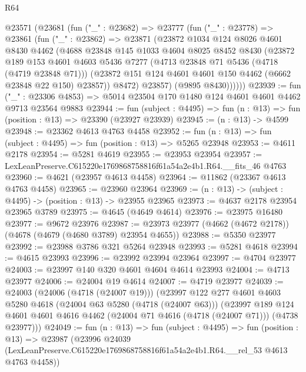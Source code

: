 \begin{lexlean}{R64}
\begin{coremodule}
    @23571
      (@23681
        (fun ("_" : @23682) =>
        @23777
          (fun ("_" : @23778) =>
          @23861
            (fun ("_" : @23862) =>
            @23871
              (@23872
                @1034
                @124
                @8026
                @4601
                @8430
                @4462
                (@4688
                  @23848
                  @145
                  @1033
                  @4604
                  @8025
                  @8452
                  @8430
                  (@23872
                    @189
                    @153
                    @4601
                    @4603
                    @5436
                    @7277
                    (@4713 @23848 @71 @5436 (@4718 (@4719 @23848 @71)))
                    (@23872 @151 @124 @4601 @4601 @150 @4462 (@6662 @23848 @22 @150) @23857))
                  @8472)
                @23857)
              (@9895 @8430))))))
@23939 := fun ("_" : @23306 @4853) =>
  @5014 @23504 @170 @1480 @124 @4601 @4601 @4462 @9713 @23564 @9883
@23944 := fun (subject : @4495) => fun (n : @13) => fun (position : @13) => @23390 (@23927 @23939)
@23945 := (n : @13) -> @4599
@23948 := @23362 @4613 @4763 @4458
@23952 := fun (n : @13) => fun (subject : @4495) => fun (position : @13) => @5265 @23948
@23953 := @4611 @2178
@23954 := @5281 @4619
@23955 := @23953 @23954
@23957 := LexLeanPreserve.C615220e1769868758816f61a54a2e4b1.R64.__fits_46 @4763
@23960 := @4621 (@23957 @4613 @4458)
@23964 := @11862 (@23367 @4613 @4763 @4458)
@23965 := @23960 @23964
@23969 := (n : @13) -> (subject : @4495) -> (position : @13) -> @23955 @23965
@23973 := @4637 @2178 @23954 @23965 @3789
@23975 := @4645 (@4649 @4614)
@23976 := @23975 @16480
@23977 := @9672 @23976
@23987 := @23973 @23977 (@4662 (@4672 @2178)) (@4678 (@4679 (@4680 @3789) @23954 @4655))
@23988 := @5350 @23977
@23992 := @23988 @3786 @321 @5264 @23948
@23993 := @5281 @4618
@23994 := @4615 @23993
@23996 := @23992 @23994 @23964
@23997 := @4704 @23977
@24003 := @23997 @140 @320 @4601 @4604 @4614 @23993
@24004 := @4713 @23977
@24006 := @24004 @19 @4614
@24007 := @4719 @23977
@24039 := @24003
    (@24006 (@4718 (@24007 @19)))
    (@23997
      @122
      @277
      @4601
      @4603
      @5280
      @4618
      (@24004 @63 @5280 (@4718 (@24007 @63)))
      (@23997
        @189
        @124
        @4601
        @4601
        @4616
        @4462
        (@24004 @71 @4616 (@4718 (@24007 @71)))
        (@4738 @23977)))
@24049 := fun (n : @13) =>
  fun (subject : @4495) =>
  fun (position : @13) =>
  @23987
    (@23996
      @24039
      (LexLeanPreserve.C615220e1769868758816f61a54a2e4b1.R64.__rel_53 @4613 @4763 @4458))

\end{coremodule}
\end{lexlean}
